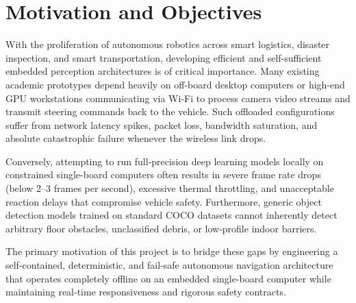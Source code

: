 \section{Motivation and Objectives}
With the proliferation of autonomous robotics across smart logistics, disaster inspection, and smart transportation, developing efficient and self-sufficient embedded perception architectures is of critical importance. Many existing academic prototypes depend heavily on off-board desktop computers or high-end GPU workstations communicating via Wi-Fi to process camera video streams and transmit steering commands back to the vehicle. Such offloaded configurations suffer from network latency spikes, packet loss, bandwidth saturation, and absolute catastrophic failure whenever the wireless link drops. 

Conversely, attempting to run full-precision deep learning models locally on constrained single-board computers often results in severe frame rate drops (below 2--3 frames per second), excessive thermal throttling, and unacceptable reaction delays that compromise vehicle safety. Furthermore, generic object detection models trained on standard COCO datasets cannot inherently detect arbitrary floor obstacles, unclassified debris, or low-profile indoor barriers. 

The primary motivation of this project is to bridge these gaps by engineering a self-contained, deterministic, and fail-safe autonomous navigation architecture that operates completely offline on an embedded single-board computer while maintaining real-time responsiveness and rigorous safety contracts.


